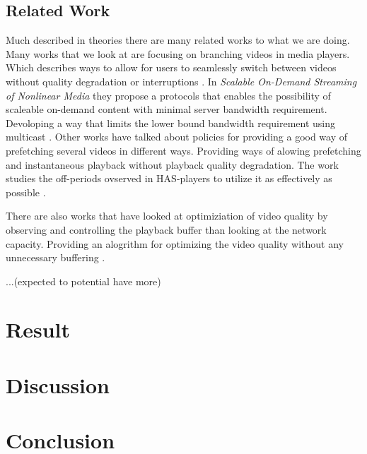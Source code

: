 \documentclass[9pt,a4paper]{acmproc}
\begin{document}
\subsection{Related Work}
Much described in theories there are many related works to what we are doing. Many works that we look at are focusing on branching videos in media players. Which describes ways to allow for users to seamlessly switch between videos without quality degradation or interruptions \cite{qualbranch, hasmultipath,scalableOnDemand}. In \textit{Scalable On-Demand Streaming of 
Nonlinear Media} they propose a protocols that enables the possibility of scaleable on-demand content with minimal server bandwidth requirement. Devoloping a way that limits the lower bound bandwidth requirement using multicast \cite{scalableOnDemand}. Other works \cite{bandawarePrefetch} have talked about policies for providing a good way of prefetching several videos in different ways. Providing ways of alowing prefetching and instantaneous playback without playback quality degradation. The work studies the off-periods ovserved in HAS-players to utilize it as effectively as possible \cite{bandawarePrefetch}.

There are also works that have looked at optimiziation of video quality by observing and controlling the playback buffer than looking at the network capacity. Providing an alogrithm for optimizing the video quality without any unnecessary buffering \cite{bufferbased}.

...(expected to potential have more)

\clearpage

\section{Result}

\section{Discussion}

\section{Conclusion}
\end{document}
